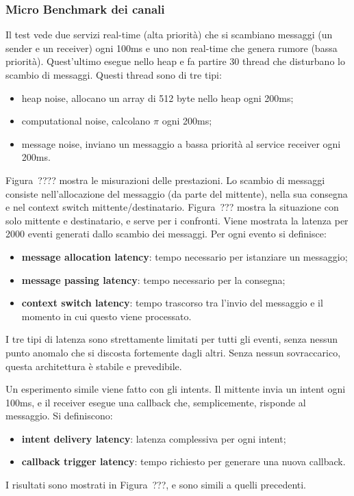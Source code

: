 \subsubsection{Micro Benchmark dei canali}
Il test vede due servizi real-time (alta priorità) che si scambiano messaggi (un sender e un receiver) ogni 100ms e uno non real-time che genera rumore (bassa priorità). Quest'ultimo esegue nello heap e fa partire 30 thread che disturbano lo scambio di messaggi. Questi thread sono di tre tipi:
\begin{itemize}
	\item heap noise, allocano un array di 512 byte nello heap ogni 200ms;
	\item computational noise, calcolano $\pi$ ogni 200ms;
	\item message noise, inviano un messaggio a bassa priorità al service receiver ogni 200ms.
\end{itemize}

Figura~???? mostra le misurazioni delle prestazioni. Lo scambio di messaggi consiste nell'allocazione del messaggio (da parte del mittente), nella sua consegna e nel context switch mittente/destinatario. Figura~??? mostra la situazione con solo mittente e destinatario, e serve per i confronti. Viene mostrata la latenza per 2000 eventi generati dallo scambio dei messaggi. Per ogni evento si definisce:
\begin{itemize}
	\item \textbf{message allocation latency}: tempo necessario per istanziare un messaggio;
	\item \textbf{message passing latency}: tempo necessario per la consegna;
	\item \textbf{context switch latency}: tempo trascorso tra l'invio del messaggio e il momento in cui questo viene processato.
\end{itemize}
I tre tipi di latenza sono strettamente limitati per tutti gli eventi, senza nessun punto anomalo che si discosta fortemente dagli altri. Senza nessun sovraccarico, questa architettura è stabile e prevedibile.

Un esperimento simile viene fatto con gli intents. Il mittente invia un intent ogni 100ms, e il receiver esegue una callback che, semplicemente, risponde al messaggio. Si definiscono:
\begin{itemize}
	\item \textbf{intent delivery latency}: latenza complessiva per ogni intent;
	\item \textbf{callback trigger latency}: tempo richiesto per generare una nuova callback.
\end{itemize}
I risultati sono mostrati in Figura~???, e sono simili a quelli precedenti.

